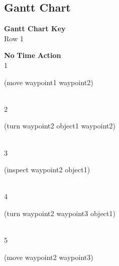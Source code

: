 \documentclass[a4paper,12pt]{article}
\newcommand{\action}[1]{{\sf #1}}
\newcommand{\listrowg}[1]{\begin{minipage}[t]{10cm} #1 \end{minipage}}
\begin{document}
\subsection{Gantt Chart}
{\bf Gantt Chart Key}\\
Row 1
\begin{tabbing}
{\bf No} \qquad \= {\bf Time} \qquad \= {\bf Action} \\
1  \> \listrowg{\action{(move waypoint1 waypoint2)}} \\
2  \> \listrowg{\action{(turn waypoint2 object1 waypoint2)}} \\
3  \> \listrowg{\action{(inspect waypoint2 object1)}} \\
4  \> \listrowg{\action{(turn waypoint2 waypoint3 object1)}} \\
5  \> \listrowg{\action{(move waypoint2 waypoint3)}} \\
\end{tabbing}
\end{document}
